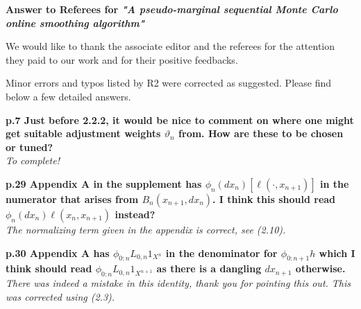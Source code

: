 \documentclass[12pt]{amsart}
\begin{document}
\begin{center}
\textbf{Answer to Referees for \textit{"A pseudo-marginal sequential Monte Carlo online smoothing algorithm"}}
\end{center}

\bigskip

We would like to thank the associate editor and the referees for the attention they paid to our work and for their positive feedbacks. 

\bigskip

Minor errors and typos listed by R2 were corrected as suggested. Please find below a few detailed answers.

\medskip

{\bf p.7 Just before 2.2.2, it would be nice to comment on where one might get suitable adjustment weights $\vartheta_n$ from. How are these to be chosen or tuned?}\\
{\em To complete!}

\medskip

{\bf p.29 Appendix A in the supplement has $\phi_n(dx_n)[\ell(\cdot,x_{n+1})]$  in the numerator that arises from $B_n(x_{n+1},dx_n)$. I think this should read $\phi_n(dx_n)\ell(x_n,x_{n+1})$  instead?}\\
{\em The normalizing term given in the appendix is correct, see (2.10).}

\medskip

{\bf p.30 Appendix A has $\phi_{0:n}L_{0,n}1_{X^n}$  in the denominator for  $\phi_{0:n+1}h$ which I think should read  $\phi_{0:n}L_{0,n}1_{X^{n+1}}$ as there is a dangling $dx_{n+1}$ otherwise.}\\
{\em There was indeed a mistake in this identity, thank you for pointing this out. This was corrected using (2.3).}

\medskip
\end{document}
